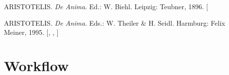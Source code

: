 \documentclass[
  12pt,
  a4paper,
  oneside,
  titlepage,
  toclink=all,
  toc=bibliography]{scrbook}
\newlength{\cslhangindent}
\newlength{\cslentryspacingunit} %
\newenvironment{CSLReferences}[2] %
 {%
  \setlength{\parindent}{0pt}
  \ifodd #1
  \let\oldpar\par
  \def\par{\hangindent=\cslhangindent\oldpar}
  \fi
  \setlength{\parskip}{#2\cslentryspacingunit}
 }%
 {}
\theoremstyle{plain}
\theoremstyle{definition}
\theoremstyle{definition}
\theoremstyle{plain}
\theoremstyle{plain}
\theoremstyle{plain}
\theoremstyle{definition}
\theoremstyle{plain}
\theoremstyle{remark}
\begin{document}
\hypertarget{refs_scriv211}{}
\begin{CSLReferences}{0}{1}
\leavevmode{}%
ARISTOTELIS. \emph{De Anima}. Ed.: W. Biehl. Leipzig: Teubner, 1896.
{[}\Acrobatmenu{GoBack}{$\hookleftarrow$}{]}

\leavevmode{}%
ARISTOTELIS. \emph{De Anima}. Eds.: W. Theiler \& H. Seidl. Harmburg:
Felix Meiner, 1995. {[},
\protect\hyperlink{cite_61}{\pageref{cite_61}},
\protect\hyperlink{cite_62}{\pageref{cite_62}}{]}

\end{CSLReferences}

\hypertarget{sec-scriv212}{%
\chapter{Workflow}\label{sec-scriv212}}
\end{document}
